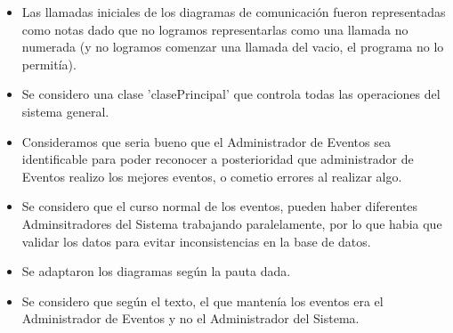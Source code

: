 \begin{itemize}
	\item Las llamadas iniciales de los diagramas de comunicaci\'on fueron representadas como notas dado que no logramos representarlas como una llamada no numerada (y no logramos comenzar una llamada del vacio, el programa no lo permit\'ia).
	\item Se considero una clase 'clasePrincipal' que controla todas las operaciones del sistema general.
	\item Consideramos que seria bueno que el Administrador de Eventos sea identificable para poder reconocer a posterioridad que administrador de Eventos realizo los mejores eventos, o cometio errores al realizar algo.
	\item Se considero que el curso normal de los eventos, pueden haber diferentes Adminsitradores del Sistema trabajando paralelamente, por lo que habia que validar los datos para evitar inconsistencias en la base de datos.
	\item Se adaptaron  los diagramas seg\'un la pauta dada.
	\item Se considero que seg\'un el texto, el que manten\'ia los eventos era el Administrador de Eventos y no el Administrador del Sistema.
\end{itemize}
